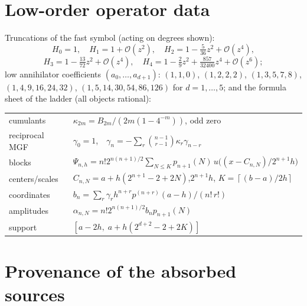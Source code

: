 \documentclass[11pt,oneside]{article}
\numberwithin{equation}{section}
\theoremstyle{definition}
\theoremstyle{remark}
\newcommand{\bigO}{\mathcal O}
\newcommand{\ceil}[1]{\left\lceil #1\right\rceil}
\begin{document}
\appendix

\section{Low-order operator data}
\label{app:operator-data}

Truncations of the fast symbol (acting on degrees shown):
\[
 H_0=1,\quad H_1=1+\bigO(z^{2}),\quad
 H_2=1-\tfrac5{36}z^{2}+\bigO(z^{4}),
\]
\[
 H_3=1-\tfrac{13}{72}z^{2}+\bigO(z^{4}),\quad
 H_4=1-\tfrac29z^{2}+\tfrac{857}{32400}z^{4}+\bigO(z^{6});
\]
low annihilator coefficients $(a_0,\dots,a_{d+1})$:
$(1,1,0)$, $(1,2,2,2)$, $(1,3,5,7,8)$, $(1,4,9,16,24,32)$,
$(1,5,14,30,54,86,126)$ for $d=1,\dots,5$; and the formula sheet of
the ladder (all objects rational):
\begin{center}
\small
\begin{tabular}{@{}ll@{}}
\toprule
cumulants & $\kappa_{2m}=B_{2m}/(2m(1-4^{-m}))$, odd zero\\
reciprocal MGF & $\gamma_0=1$,\ \
$\gamma_n=-\sum_{r}\binom{n-1}{r-1}\kappa_r\gamma_{n-r}$\\
blocks & $\Psi_{n,h}
=n!2^{n(n+1)/2}\sum_{N\le K}p_{n+1}(N)\,
u\bigl((x-C_{n,N})/2^{n+1}h\bigr)$\\
centers/scales & $C_{n,N}=a+h(2^{n+1}-2+2N)$,\quad $2^{n+1}h$,\quad
$K=\ceil{(b-a)/2h}$\\
coordinates & $b_n=\sum_r\gamma_rh^{n+r}p^{(n+r)}(a-h)/(n!\,r!)$\\
amplitudes & $\alpha_{n,N}=n!2^{n(n+1)/2}b_np_{n+1}(N)$\\
support & $[a-2h,\;a+h(2^{d+2}-2+2K)]$\\
\bottomrule
\end{tabular}
\end{center}

\section{Provenance of the absorbed sources}
\label{sec:provenance-poly}
\end{document}

